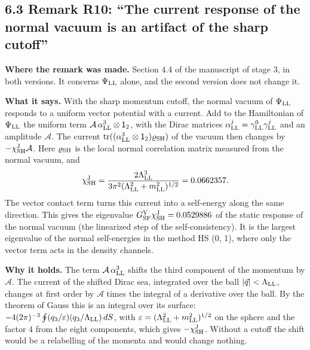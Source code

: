 \documentclass[
  10pt,
]{article}
\begin{document}
\hypertarget{remark-r10-the-current-response-of-the-normal-vacuum-is-an-artifact-of-the-sharp-cutoff}{%
\subsection{6.3 Remark R10: ``The current response of the normal vacuum
is an artifact of the sharp
cutoff''}\label{remark-r10-the-current-response-of-the-normal-vacuum-is-an-artifact-of-the-sharp-cutoff}}

\textbf{Where the remark was made.} Section 4.4 of the manuscript of
stage 3, in both versions. It concerns \(\Psi_{\rm LL}\) alone, and the
second version does not change it.

\textbf{What it says.} With the sharp momentum cutoff, the normal vacuum
of \(\Psi_{\rm LL}\) responds to a uniform vector potential with a
current. Add to the Hamiltonian of \(\Psi_{\rm LL}\) the uniform term
\(\mathcal A\,\alpha^3_{\rm LL}\otimes\mathsf 1_2\), with the Dirac
matrices \(\alpha^j_{\rm LL}=\gamma^0_{\rm LL}\gamma^j_{\rm LL}\) and an
amplitude \(\mathcal A\). The current
\(\mathrm{tr}((\alpha^3_{\rm LL}\otimes\mathsf 1_2)\varrho_{\rm SH})\)
of the vacuum then changes by \(-\chi^{\rm J}_{\rm SH}\mathcal A\). Here
\(\varrho_{\rm SH}\) is the local normal correlation matrix measured
from the normal vacuum, and
\[\chi^{\rm J}_{\rm SH}=\frac{2\Lambda_{\rm LL}^3}{3\pi^2(\Lambda_{\rm LL}^2+m_{\rm LL}^2)^{1/2}}=0.0662357.\]
The vector contact term turns this current into a self-energy along the
same direction. This gives the eigenvalue
\(G^{\rm V}_{\rm SF}\chi^{\rm J}_{\rm SH}=0.0529886\) of the static
response of the normal vacuum (the linearized step of the
self-consistency). It is the largest eigenvalue of the normal
self-energies in the method HS (0, 1), where only the vector term acts
in the density channels.

\textbf{Why it holds.} The term \(\mathcal A\,\alpha^3_{\rm LL}\) shifts
the third component of the momentum by \(\mathcal A\). The current of
the shifted Dirac sea, integrated over the ball
\(\lvert\vec q\rvert<\Lambda_{\rm LL}\), changes at first order by
\(\mathcal A\) times the integral of a derivative over the ball. By the
theorem of Gauss this is an integral over its surface:
\(-4(2\pi)^{-3}\oint(q_3/\varepsilon)(q_3/\Lambda_{\rm LL})\,dS\), with
\(\varepsilon=(\Lambda_{\rm LL}^2+m_{\rm LL}^2)^{1/2}\) on the sphere
and the factor 4 from the eight components, which gives
\(-\chi^{\rm J}_{\rm SH}\). Without a cutoff the shift would be a
relabelling of the momenta and would change nothing.
\end{document}
